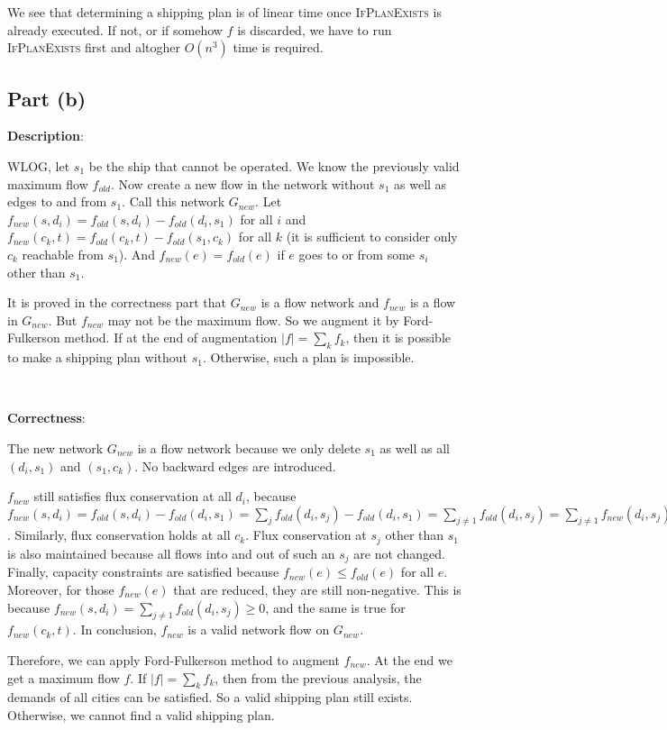 \documentclass{article}
\begin{document}
We see that determining a shipping plan is of linear time once \textsc{IfPlanExists} is already executed. If not, or if somehow $f$ is discarded, we have to run \textsc{IfPlanExists} first and altogher $O(n^3)$ time is required.

\subsection{Part (b)}
\noindent\textbf{Description}:

WLOG, let $s_1$ be the ship that cannot be operated. We know the previously valid maximum flow $f_{old}$. Now create a new flow in the network without $s_1$ as well as edges to and from $s_1$. Call this network $G_{new}$. Let $f_{new}(s,d_i)=f_{old}(s,d_i)-f_{old}(d_i,s_1)$ for all $i$ and $f_{new}(c_k,t)=f_{old}(c_k,t)-f_{old}(s_1,c_k)$ for all $k$ (it is sufficient to consider only $c_k$ reachable from $s_1$). And $f_{new}(e)=f_{old}(e)$ if $e$ goes to or from some $s_i$ other than $s_1$.

It is proved in the correctness part that $G_{new}$ is a flow network and $f_{new}$ is a flow in $G_{new}$. But $f_{new}$ may not be the maximum flow. So we augment it by Ford-Fulkerson method. If at the end of augmentation $|f|=\sum_kf_k$, then it is possible to make a shipping plan without $s_1$. Otherwise, such a plan is impossible.

~

\noindent\textbf{Correctness}:

The new network $G_{new}$ is a flow network because we only delete $s_1$ as well as all $(d_i,s_1)$ and $(s_1,c_k)$. No backward edges are introduced.

$f_{new}$ still satisfies flux conservation at all $d_i$, because $f_{new}(s,d_i)=f_{old}(s,d_i)-f_{old}(d_i,s_1)=\sum_jf_{old}(d_i,s_j)-f_{old}(d_i,s_1)=\sum_{j\neq1}f_{old}(d_i,s_j)=\sum_{j\neq1}f_{new}(d_i,s_j)$. Similarly, flux conservation holds at all $c_k$. Flux conservation at $s_j$ other than $s_1$ is also maintained because all flows into and out of such an $s_j$ are not changed. Finally, capacity constraints are satisfied because $f_{new}(e)\leqslant f_{old}(e)$ for all $e$. Moreover, for those $f_{new}(e)$ that are reduced, they are still non-negative. This is because $f_{new}(s,d_i)=\sum_{j\neq1}f_{old}(d_i,s_j)\geqslant0$, and the same is true for $f_{new}(c_k,t)$. In conclusion, $f_{new}$ is a valid network flow on $G_{new}$.

Therefore, we can apply Ford-Fulkerson method to augment $f_{new}$. At the end we get a maximum flow $f$. If $|f|=\sum_kf_k$, then from the previous analysis, the demands of all cities can be satisfied. So a valid shipping plan still exists. Otherwise, we cannot find a valid shipping plan.
\end{document}
